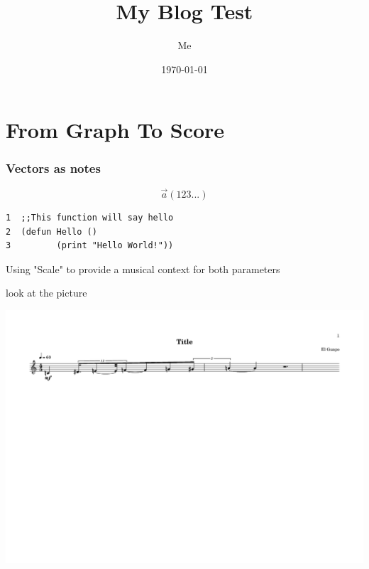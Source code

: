 \documentclass[11pt]{article}
\author{Me}
\date{\today}
\title{My Blog Test}
\begin{document}
\maketitle
\tableofcontents


\section{From Graph To Score}
\label{sec:org4f50e07}

\subsubsection{Vectors as notes}
\label{sec:org5241dd6}
\begin{equation}                       
\vec{a}(1 2 3 ...)                             
\end{equation} 

\begin{verbatim}
1  ;;This function will say hello
2  (defun Hello ()
3         (print "Hello World!"))
\end{verbatim}

Using "Scale" to provide a musical context for both parameters 

look at the picture 
\begin{center}
\includegraphics[width=.9\linewidth]{test.png}
\end{center}
\end{document}
